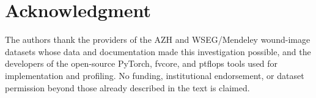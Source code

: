 \documentclass[conference]{IEEEtran}
\begin{document}
\section*{Acknowledgment}

The authors thank the providers of the AZH and WSEG/Mendeley wound-image datasets whose data and documentation made this investigation possible, and the developers of the open-source PyTorch, fvcore, and ptflops tools used for implementation and profiling. No funding, institutional endorsement, or dataset permission beyond those already described in the text is claimed.



\end{document}
